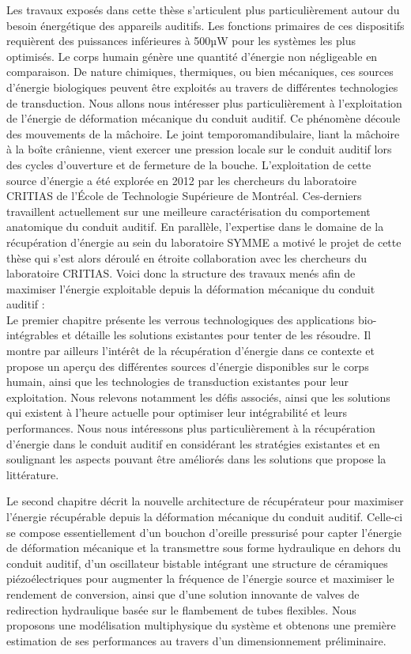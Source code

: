 Les travaux exposés dans cette thèse s'articulent plus particulièrement autour du besoin énergétique des appareils auditifs. Les fonctions primaires de ces dispositifs requièrent des puissances inférieures à 500µW pour les systèmes les plus optimisés. Le corps humain génère une quantité d'énergie non négligeable en comparaison. De nature chimiques, thermiques, ou bien mécaniques, ces sources d'énergie biologiques peuvent être exploités au travers de différentes technologies de transduction. Nous allons nous intéresser plus particulièrement à l'exploitation de l'énergie de déformation mécanique du conduit auditif. Ce phénomène découle des mouvements de la mâchoire. Le joint temporomandibulaire, liant la mâchoire à la boîte crânienne, vient exercer une pression locale sur le conduit auditif lors des cycles d'ouverture et de fermeture de la bouche. L'exploitation de cette source d'énergie a été explorée en 2012 par les chercheurs du laboratoire CRITIAS de l'École de Technologie  Supérieure de Montréal. Ces-derniers travaillent actuellement sur une meilleure caractérisation du comportement anatomique du conduit auditif. En parallèle, l'expertise dans le domaine de la récupération d'énergie au sein du laboratoire SYMME a motivé le projet de cette thèse qui s'est alors déroulé en étroite collaboration avec les chercheurs du laboratoire CRITIAS. Voici donc la structure des travaux menés afin de maximiser l'énergie exploitable depuis la déformation mécanique du conduit auditif : \\

Le premier chapitre présente les verrous technologiques des applications bio-intégrables et détaille les solutions existantes pour tenter de les résoudre. Il montre par ailleurs l'intérêt de la récupération d'énergie dans ce contexte et propose un aperçu des différentes sources d'énergie disponibles sur le corps humain, ainsi que les technologies de transduction existantes pour leur exploitation. Nous relevons notamment les défis associés, ainsi que les solutions qui existent à l'heure actuelle pour optimiser leur intégrabilité et leurs performances. Nous nous intéressons plus particulièrement à la récupération d'énergie dans le conduit auditif en considérant les stratégies existantes et en soulignant les aspects pouvant être améliorés dans les solutions que propose la littérature.

Le second chapitre décrit la nouvelle architecture de récupérateur pour maximiser l'énergie récupérable depuis la déformation mécanique du conduit auditif. Celle-ci se compose essentiellement d'un bouchon d'oreille pressurisé pour capter l'énergie de déformation mécanique et la transmettre sous forme hydraulique en dehors du conduit auditif, d'un oscillateur bistable intégrant une structure de céramiques piézoélectriques pour augmenter la fréquence de l'énergie source et maximiser le rendement de conversion, ainsi que d'une solution innovante de valves de redirection hydraulique basée sur le flambement de tubes flexibles. Nous proposons une modélisation multiphysique du système et obtenons une première estimation de ses performances au travers d'un dimensionnement préliminaire.

